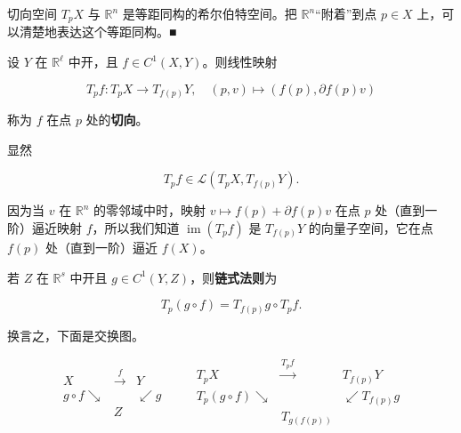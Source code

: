 \begin{remark}

切向空间 $ T_{p}X $ 与 $ \mathbb{R}^{n} $ 是等距同构的希尔伯特空间。把 $ \mathbb{R}^{n} $“附着”到点 $ p \in X $ 上，可以清楚地表达这个等距同构。\nobreak\hspace{0.35em}■

设 $ Y $ 在 $ \mathbb{R}^{\ell} $ 中开，且 $ f \in C^{1}(X,Y) $。则线性映射

\[
T_{p}f : T_{p}X \to T_{f(p)}Y , \quad (p,v) \mapsto (f(p), \partial f(p)v)
\]

称为 $ f $ 在点 $ p $ 处的\textbf{切向}。

\end{remark}

\begin{remark}

\begin{items}
\item

显然

\[
T_{p}f \in \mathcal{L}(T_{p}X, T_{f(p)}Y) .
\]

因为当 $ v $ 在 $ \mathbb{R}^{n} $ 的零邻域中时，映射 $ v \mapsto f(p) + \partial f(p)v $ 在点 $ p $ 处（直到一阶）逼近映射 $ f $，所以我们知道 $ \operatorname{im}(T_{p}f) $ 是 $ T_{f(p)}Y $ 的向量子空间，它在点 $ f(p) $ 处（直到一阶）逼近 $ f(X) $。

\end{items}


\begin{items}
\item[（b）]

若 $ Z $ 在 $ \mathbb{R}^{s} $ 中开且 $ g \in C^{1}(Y,Z) $，则\textbf{链式法则}为

\[
T_{p}(g\circ f) = T_{f(p)}g\circ T_{p}f .
\]

换言之，下面是交换图。

\begin{equation*}
\begin{array}{ccc} X & \xrightarrow{f} & Y \\ g\circ f \searrow & & \swarrow g \\ & Z & \end{array} \qquad \begin{array}{ccc} T_{p}X & \xrightarrow{T_{p}f} & T_{f(p)}Y \\ T_{p}(g\circ f) \searrow & & \swarrow T_{f(p)}g \\ & T_{g(f(p))} & \end{array}
\end{equation*}


\end{items}
\end{remark}
